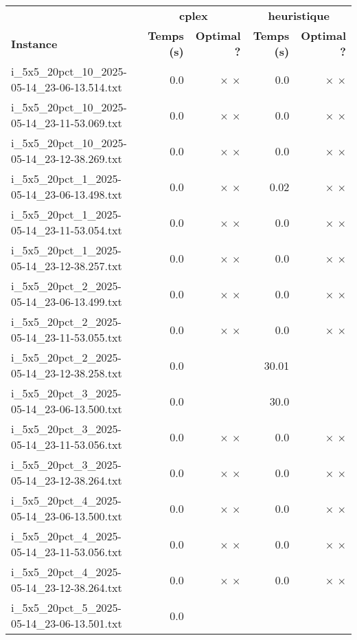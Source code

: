 \documentclass{article}
\begin{document}
\begin{center}
\renewcommand{\arraystretch}{1.4} 
 \begin{tabular}{lrrrr}
	\hline
 & \multicolumn{2}{c}{\textbf{cplex}} & \multicolumn{2}{c}{\textbf{heuristique}}\\
\textbf{Instance}  & \textbf{Temps (s)} & \textbf{Optimal ?}  & \textbf{Temps (s)} & \textbf{Optimal ?} \\\hline

i\_5x5\_20pct\_10\_2025-05-14\_23-06-13.514.txt & 0.0 & 
$\times$
$\times$
 & 0.0 & 
$\times$
$\times$
\\
i\_5x5\_20pct\_10\_2025-05-14\_23-11-53.069.txt & 0.0 & 
$\times$
$\times$
 & 0.0 & 
$\times$
$\times$
\\
i\_5x5\_20pct\_10\_2025-05-14\_23-12-38.269.txt & 0.0 & 
$\times$
$\times$
 & 0.0 & 
$\times$
$\times$
\\
i\_5x5\_20pct\_1\_2025-05-14\_23-06-13.498.txt & 0.0 & 
$\times$
$\times$
 & 0.02 & 
$\times$
$\times$
\\
i\_5x5\_20pct\_1\_2025-05-14\_23-11-53.054.txt & 0.0 & 
$\times$
$\times$
 & 0.0 & 
$\times$
$\times$
\\
i\_5x5\_20pct\_1\_2025-05-14\_23-12-38.257.txt & 0.0 & 
$\times$
$\times$
 & 0.0 & 
$\times$
$\times$
\\
i\_5x5\_20pct\_2\_2025-05-14\_23-06-13.499.txt & 0.0 & 
$\times$
$\times$
 & 0.0 & 
$\times$
$\times$
\\
i\_5x5\_20pct\_2\_2025-05-14\_23-11-53.055.txt & 0.0 & 
$\times$
$\times$
 & 0.0 & 
$\times$
$\times$
\\
i\_5x5\_20pct\_2\_2025-05-14\_23-12-38.258.txt & 0.0 & 
 & 30.01 & 
\\
i\_5x5\_20pct\_3\_2025-05-14\_23-06-13.500.txt & 0.0 & 
 & 30.0 & 
\\
i\_5x5\_20pct\_3\_2025-05-14\_23-11-53.056.txt & 0.0 & 
$\times$
$\times$
 & 0.0 & 
$\times$
$\times$
\\
i\_5x5\_20pct\_3\_2025-05-14\_23-12-38.264.txt & 0.0 & 
$\times$
$\times$
 & 0.0 & 
$\times$
$\times$
\\
i\_5x5\_20pct\_4\_2025-05-14\_23-06-13.500.txt & 0.0 & 
$\times$
$\times$
 & 0.0 & 
$\times$
$\times$
\\
i\_5x5\_20pct\_4\_2025-05-14\_23-11-53.056.txt & 0.0 & 
$\times$
$\times$
 & 0.0 & 
$\times$
$\times$
\\
i\_5x5\_20pct\_4\_2025-05-14\_23-12-38.264.txt & 0.0 & 
$\times$
$\times$
 & 0.0 & 
$\times$
$\times$
\\
i\_5x5\_20pct\_5\_2025-05-14\_23-06-13.501.txt & 0.0 & 

\end{tabular}
\end{center}
\end{document}
